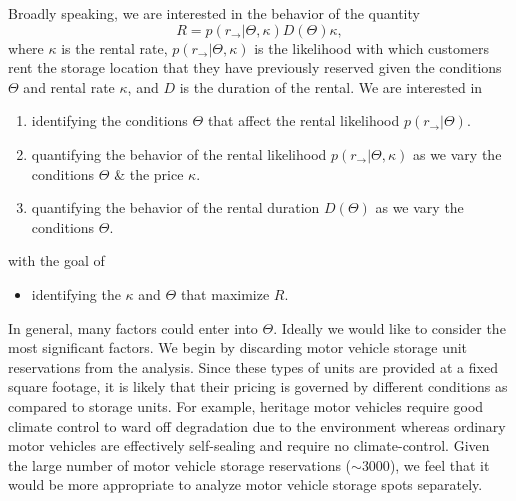 \documentclass[times]{aastex6}
\begin{document}
Broadly speaking, we are interested in the behavior of the quantity
\begin{equation}\label{eq:Revenue}
    R = p(r_{\rightarrow} | \Theta, \kappa) D(\Theta) \kappa,
\end{equation}
where $\kappa$ is the rental rate, $p(r_{\rightarrow} | \Theta, \kappa)$ is the likelihood with which customers rent the storage location that they have previously reserved given the conditions $\Theta$ and rental rate $\kappa$, and $D$ is the duration of the rental. We are interested in
\begin{enumerate}
    \item identifying the conditions $\Theta$ that affect the rental likelihood $p(r_{\rightarrow} | \Theta)$.
    \item quantifying the behavior of the rental likelihood $p(r_{\rightarrow} | \Theta, \kappa)$ as we vary the conditions $\Theta$ \& the price $\kappa$.
    \item quantifying the behavior of the rental duration $D(\Theta)$ as we vary the conditions $\Theta$.
\end{enumerate}
with the goal of
\begin{itemize}
    \item identifying the $\kappa$ and $\Theta$ that maximize $R$.
\end{itemize}

In general, many factors could enter into $\Theta$. Ideally we would like to consider the most significant factors. We begin by discarding motor vehicle storage unit reservations from the analysis. Since these types of units are provided at a fixed square footage, it is likely that their pricing is governed by different conditions as compared to storage units. For example, heritage motor vehicles require good climate control to ward off degradation due to the environment whereas ordinary motor vehicles are effectively self-sealing and require no climate-control. Given the large number of motor vehicle storage reservations ($\sim 3000$), we feel that it would be more appropriate to analyze motor vehicle storage spots separately.
\end{document}
